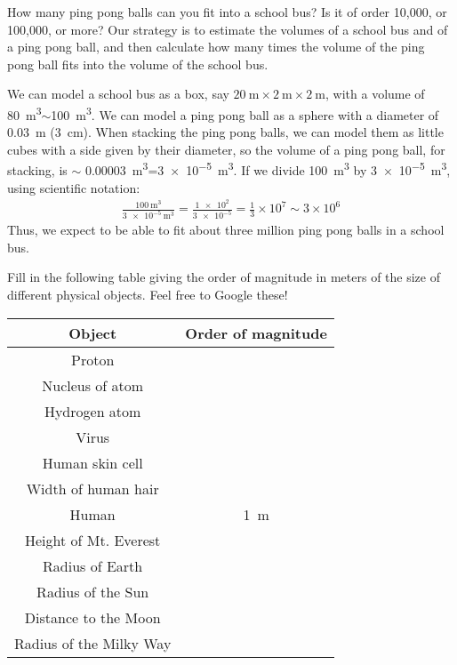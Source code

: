 \begin{example}{How many ping pong balls can you fit into a school bus? Is it of order 10,000, or 100,000, or more?}
Our strategy is to estimate the volumes of a school bus and of a ping pong ball, and then calculate how many times the volume of the ping pong ball fits into the volume of the school bus.

We can model a school bus as a box, say $\SI{20}{\meter}\times \SI{2}{\meter}\times\SI{2}{\meter}$, with a volume of \SI{80}{\meter\cubed}$\sim$\SI{100}{\meter\cubed}. We can model a ping pong ball as a sphere with a diameter of \SI{0.03}{\meter} (\SI{3}{\centi\meter}). When stacking the ping pong balls, we can model them as little cubes with a side given by their diameter, so the volume of a ping pong ball, for stacking, is $\sim$ \SI{0.00003}{\meter\cubed}=\SI{3e-5}{\meter\cubed}. If we divide \SI{100}{\meter\cubed} by \SI{3e-5}{\meter\cubed}, using scientific notation:
\begin{align*}
\frac{\SI{100}{\meter\cubed}}{\SI{3e-5}{\meter\cubed}}=\frac{\num{1e2}}{\num{3e-5}}=\frac{1}{3}\times 10^7\sim 3\times 10^6
\end{align*}
Thus, we expect to be able to fit about three million ping pong balls in a school bus. 
\end{example}

\begin{checkpointSA}{Fill in the following table giving the order of magnitude in meters of the size of different physical objects. Feel free to Google these!}
\begin{center}
\begin{tabular}{|c|c| }
\hline  
\textbf{Object}&\textbf{Order of magnitude}\\
\hline
Proton&\\ \hline
Nucleus of atom&\\ \hline
Hydrogen atom&\\ \hline
Virus&\\ \hline
Human skin cell&\\ \hline
Width of human hair&\\ \hline
Human &\SI{1}{\meter}\\ \hline
Height of Mt. Everest&\\ \hline
Radius of Earth&\\ \hline
Radius of the Sun&\\ \hline
Distance to the Moon&\\ \hline
Radius of the Milky Way&\\ \hline
\end{tabular}
\end{center}
\end{checkpointSA}


